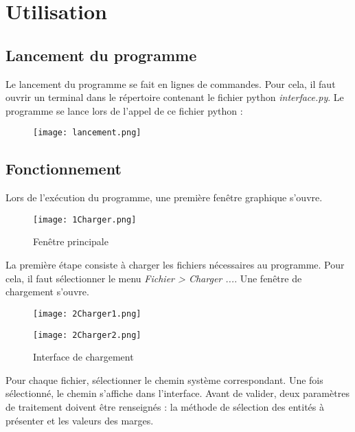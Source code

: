 \chapter[Utilisation]{Utilisation}

\section{Lancement du programme}

Le lancement du programme se fait en lignes de commandes. Pour cela, il faut ouvrir un terminal dans le répertoire contenant le fichier python \textit{interface.py}. Le programme se lance lors de l'appel de ce fichier python : 
\begin{figure}[H]
	\texttt{[image: lancement.png]} 
	\label{fig:lancement}
\end{figure}

\section{Fonctionnement}

Lors de l'exécution du programme, une première fenêtre graphique s'ouvre.
\begin{figure}[H]
	\centering
	\texttt{[image: 1Charger.png]} 
	\caption[Fenêtre principale]{Fenêtre principale}
	\label{fig:interfaceinitiale}
\end{figure}

La première étape consiste à charger les fichiers nécessaires au programme. Pour cela, il faut sélectionner le menu \textit{Fichier > Charger ...}. Une fenêtre de chargement s'ouvre.
\begin{figure}[H]
	\begin{minipage}{0.45\linewidth}
		\centering
		\texttt{[image: 2Charger1.png]}  \\
	\end{minipage}
	\hfill
	\begin{minipage}{0.45\linewidth}
		\centering
		\texttt{[image: 2Charger2.png]}  \\
	\end{minipage}
	\caption[Interface de chargement]{Interface de chargement}
	\label{fig:interfacecharger}
\end{figure}

Pour chaque fichier, sélectionner le chemin système correspondant. Une fois sélectionné, le chemin s'affiche dans l'interface. Avant de valider, deux paramètres de traitement doivent être renseignés : la méthode de sélection des entités à présenter et les valeurs des marges.\\

